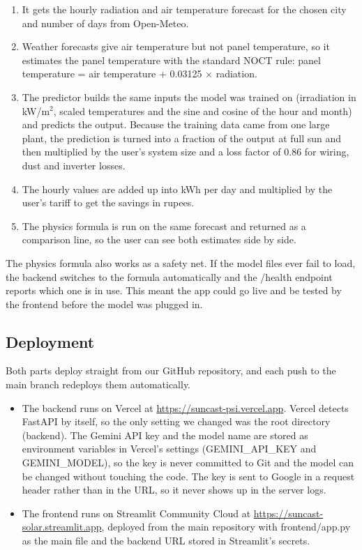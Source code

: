 \begin{enumerate}
    \item It gets the hourly radiation and air temperature forecast for the chosen city and number of days from Open-Meteo.
    \item Weather forecasts give air temperature but not panel temperature, so it estimates the panel temperature with the standard NOCT rule: panel temperature = air temperature + 0.03125 $\times$ radiation.
    \item The predictor builds the same inputs the model was trained on (irradiation in kW/m$^2$, scaled temperatures and the sine and cosine of the hour and month) and predicts the output. Because the training data came from one large plant, the prediction is turned into a fraction of the output at full sun and then multiplied by the user's system size and a loss factor of 0.86 for wiring, dust and inverter losses.
    \item The hourly values are added up into kWh per day and multiplied by the user's tariff to get the savings in rupees.
    \item The physics formula is run on the same forecast and returned as a comparison line, so the user can see both estimates side by side.
\end{enumerate}

The physics formula also works as a safety net. If the model files ever fail to load, the backend switches to the formula automatically and the /health endpoint reports which one is in use. This meant the app could go live and be tested by the frontend before the model was plugged in.

\subsection{Deployment}

Both parts deploy straight from our GitHub repository, and each push to the main branch redeploys them automatically.

\begin{itemize}
    \item The backend runs on Vercel at \url{https://suncast-psi.vercel.app}. Vercel detects FastAPI by itself, so the only setting we changed was the root directory (backend). The Gemini API key and the model name are stored as environment variables in Vercel's settings (GEMINI\_API\_KEY and GEMINI\_MODEL), so the key is never committed to Git and the model can be changed without touching the code. The key is sent to Google in a request header rather than in the URL, so it never shows up in the server logs.
    \item The frontend runs on Streamlit Community Cloud at \url{https://suncast-solar.streamlit.app}, deployed from the main repository with frontend/app.py as the main file and the backend URL stored in Streamlit's secrets.
\end{itemize}


